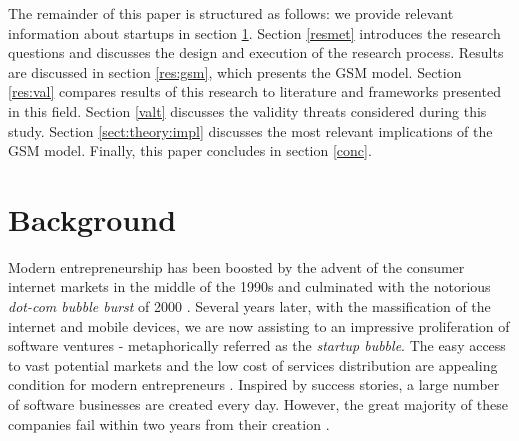 \documentclass[10pt,journal,letterpaper,compsoc]{IEEEtran}
\begin{document}
The remainder of this paper is structured as follows:  we provide relevant information about startups in section \ref{backg}. Section \ref{resmet} introduces the research questions and discusses the design and execution of the research process. Results are discussed in section \ref{res:gsm}, which presents the GSM model. Section \ref{res:val}  compares results of this research to literature and frameworks presented in this field. Section \ref{valt} discusses the validity threats considered during this study. Section \ref{sect:theory:impl} discusses the most relevant implications of the GSM model. Finally, this paper concludes in section \ref{conc}.





 
\section{Background}
\label{backg}

Modern entrepreneurship has been boosted by the advent of the consumer internet markets in the middle of the 1990s and culminated with the notorious \textit{dot-com bubble burst} of 2000 \cite{Perkins:1999:IBI:555126, storey1982entrepreneurship}. Several years later, with the massification of the internet and mobile devices, we are now assisting to an impressive proliferation of software ventures - metaphorically referred as the \textit{startup bubble}. The easy access to vast potential markets and the low cost of services distribution are appealing condition for modern entrepreneurs \cite{Marmer2011}. Inspired by success stories, a large number of software businesses are created every day. However, the great majority of these companies fail within two years from their creation \cite{Crowne2002}.
\end{document}

